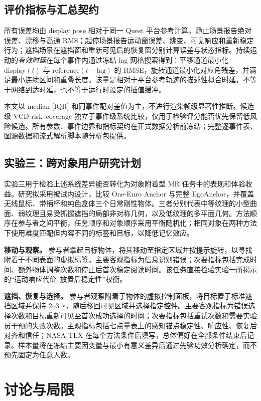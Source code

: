 \documentclass[review]{vgtc}
\begin{document}
\subsection{评价指标与汇总契约}

所有误差均由 display pose 相对于同一 Quest 平台参考计算。静止场景报告绝对误差、漂移与高通 RMS；起停场景报告运动窗误差、跳变、可见响应和重新稳定行为；遮挡场景在遮挡窗和重新可见后的恢复窗分别计算误差与状态指标。持续运动的\emph{有效时延}在每个事件内通过冻结 lag 网格搜索得到：平移通道最小化 $\mathrm{display}(t)$ 与 $\mathrm{reference}(t-\mathrm{lag})$ 的 RMSE，旋转通道最小化对应角残差，并满足最小连续区间和重叠长度。该量是相对于平台参考轨迹的描述性拟合时延，不等于网络到达时延，也不等于运行时设定的插值缓冲。

本文以 median [IQR] 和同事件配对差值为主，不进行渲染帧级显著性推断。候选级 VCD risk--coverage 独立于事件级系统比较，仅用于检验评分能否优先保留低风险候选。所有参数、事件边界和指标契约在正式数据分析前冻结；完整逐事件表、图源数据和流式解析脚本随分析包提供。

\subsection{实验三：跨对象用户研究计划}

实验三用于检验上述系统差异能否转化为对象附着型 MR 任务中的表现和体验收益。研究拟采用被试内设计，比较 One-Euro Anchor 与完整 EgoAnchor，并覆盖无线鼠标、带柄杯和纯色盒体三个日常刚性物体。三者分别代表中等纹理的小型曲面、弱纹理且易受抓握遮挡的局部非对称几何，以及低纹理的多平面几何。方法顺序在参与者之间平衡，任务顺序和对象顺序采用平衡随机化；相同对象在两种方法下使用难度匹配但内容不同的标签和目标，以降低记忆效应。

\textbf{移动与观察。} 参与者拿起目标物体，将其移动至指定区域并按提示旋转，以寻找附着于不同表面的虚拟标签。主要客观指标为信息识别错误；次要指标包括完成时间、额外物体调整次数和停止后首次稳定阅读时间。该任务直接检验实验一所揭示的“运动响应代价--放置后稳定性”权衡。

\textbf{遮挡、恢复与选择。} 参与者观察附着于物体的虚拟控制面板，将目标置于标准遮挡区域并保持 2--3~s，随后移回可见区域并选择指定控件。主要客观指标为错误选择次数和目标重新可见至首次成功选择的时间；次要指标包括重试次数和需要实验员干预的失败次数。主观指标包括七点量表上的感知锚点稳定性、响应性、恢复后对齐和信任；NASA-TLX 在每个方法条件后填写，总体偏好在全部条件结束后记录。样本量将在冻结主要因变量与最小有意义差异后通过先验功效分析确定，而不预先固定为任意人数。

\section{讨论与局限}\label{sec:discussion}
\end{document}
